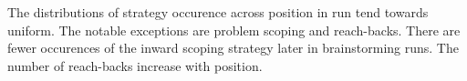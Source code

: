 The distributions of strategy occurence across position in run tend towards uniform. The notable exceptions are problem scoping and reach-backs. There are fewer occurences of the inward scoping strategy later in brainstorming runs.
The number of reach-backs increase with position. 






